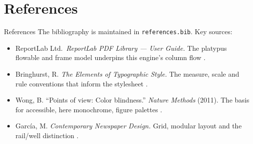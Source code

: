 \documentclass[
  ignorenonframetext,
]{beamer}
\author{\texorpdfstring{}{}}
\date{}
\providecommand{\tightlist}{%
  \setlength{\itemsep}{0pt}\setlength{\parskip}{0pt}}
\begin{document}
\section{References}\label{references}

\begin{frame}{References}
The bibliography is maintained in \texttt{references.bib}. Key sources:

\begin{itemize}
\tightlist
\item
  ReportLab Ltd.~\emph{ReportLab PDF Library --- User Guide.} The
  platypus flowable and frame model underpins this engine's column flow
  \breakseq{[@reportlab]}.
\item
  Bringhurst, R. \emph{The Elements of Typographic Style.} The measure,
  scale and rule conventions that inform the stylesheet
  \breakseq{[@bringhurst]}.
\item
  Wong, B. ``Points of view: Color blindness.'' \emph{Nature Methods}
  (2011). The basis for accessible, here monochrome, figure palettes
  \breakseq{[@wong2011]}.
\item
  García, M. \emph{Contemporary Newspaper Design.} Grid, modular layout
  and the rail/well distinction \breakseq{[@garcia]}.
\end{itemize}
\end{frame}
\end{document}
